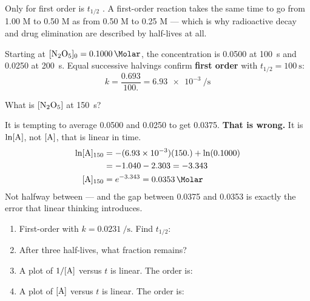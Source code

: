 \documentclass{apchem-notes}
\begin{document}

Only for first order is $t_{1/2}$ . A first-order reaction takes the same time to go from
1.00 M to 0.50 M as from 0.50 M to 0.25 M --- which is why radioactive decay
and drug elimination are described by half-lives at all.

\begin{workedexample}
Starting at $[\ce{N2O5}]_0 = \SI{0.1000}{\Molar}$, the concentration is
\SI{0.0500}{\Molar} at \SI{100}{\second} and \SI{0.0250}{\Molar} at
\SI{200}{\second}. Equal successive halvings confirm
\textbf{first order} with $t_{1/2} = \SI{100}{\second}$:
\[
  k = \frac{0.693}{100.} = \SI{6.93e-3}{\per\second}
\]
\end{workedexample}

\begin{workedexample}
What is $[\ce{N2O5}]$ at \SI{150}{\second}?

It is tempting to average 0.0500 and 0.0250 to get 0.0375. \textbf{That is
wrong.} It is $\ln[\ce{A}]$, not $[\ce{A}]$, that is linear in time.
\begin{align*}
  \ln[\ce{A}]_{150} &= -(6.93\times10^{-3})(150.) + \ln(0.1000)\\
  &= -1.040 - 2.303 = -3.343\\
  [\ce{A}]_{150} &= e^{-3.343} = \SI{0.0353}{\Molar}
\end{align*}
Not halfway between --- and the gap between 0.0375 and 0.0353 is exactly the
error that linear thinking introduces.
\end{workedexample}


\begin{enumerate}[leftmargin=*,itemsep=0.35em]
  \item First-order with $k = \SI{0.0231}{\per\second}$. Find $t_{1/2}$:
  \item After three half-lives, what fraction remains?
  \item A plot of $1/[\ce{A}]$ versus $t$ is linear. The order is:
  \item A plot of $[\ce{A}]$ versus $t$ is linear. The order is:
\end{enumerate}
\end{document}

